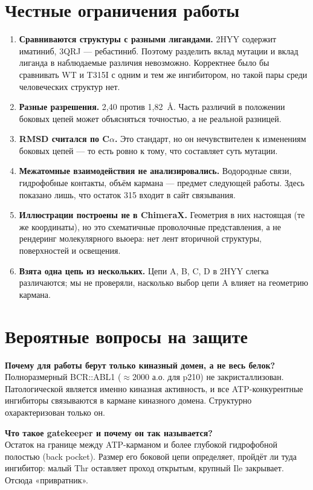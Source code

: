 \documentclass[12pt,a4paper]{article}
\begin{document}
\section{Честные ограничения работы}

\begin{enumerate}[leftmargin=*,topsep=2pt,itemsep=3pt]
\item \textbf{Сравниваются структуры с разными лигандами.} 2HYY содержит иматиниб,
3QRJ --- ребастиниб. Поэтому разделить вклад мутации и вклад лиганда в наблюдаемые
различия невозможно. Корректнее было бы сравнивать WT и T315I с одним и тем же
ингибитором, но такой пары среди человеческих структур нет.
\item \textbf{Разные разрешения.} 2{,}40 против 1{,}82~\AA. Часть различий в
положении боковых цепей может объясняться точностью, а не реальной разницей.
\item \textbf{RMSD считался по C$\alpha$.} Это стандарт, но он нечувствителен к
изменениям боковых цепей --- то есть ровно к тому, что составляет суть мутации.
\item \textbf{Межатомные взаимодействия не анализировались.} Водородные связи,
гидрофобные контакты, объём кармана --- предмет следующей работы. Здесь показано
лишь, что остаток 315 входит в сайт связывания.
\item \textbf{Иллюстрации построены не в ChimeraX.} Геометрия в них настоящая
(те же координаты), но это схематичные проволочные представления, а не рендеринг
молекулярного вьюера: нет лент вторичной структуры, поверхностей и освещения.
\item \textbf{Взята одна цепь из нескольких.} Цепи A, B, C, D в 2HYY слегка
различаются; мы не проверяли, насколько выбор цепи A влияет на геометрию кармана.
\end{enumerate}

\section{Вероятные вопросы на защите}

\textbf{Почему для работы берут только киназный домен, а не весь белок?}\\
Полноразмерный BCR::ABL1 ($\approx$2000 а.о. для p210) не закристаллизован.
Патологической является именно киназная активность, и все ATP-конкурентные
ингибиторы связываются в кармане киназного домена. Структурно охарактеризован
только он.

\medskip
\textbf{Что такое gatekeeper и почему он так называется?}\\
Остаток на границе между ATP-карманом и более глубокой гидрофобной полостью
(back pocket). Размер его боковой цепи определяет, пройдёт ли туда ингибитор:
малый Thr оставляет проход открытым, крупный Ile закрывает. Отсюда «привратник».
\end{document}
